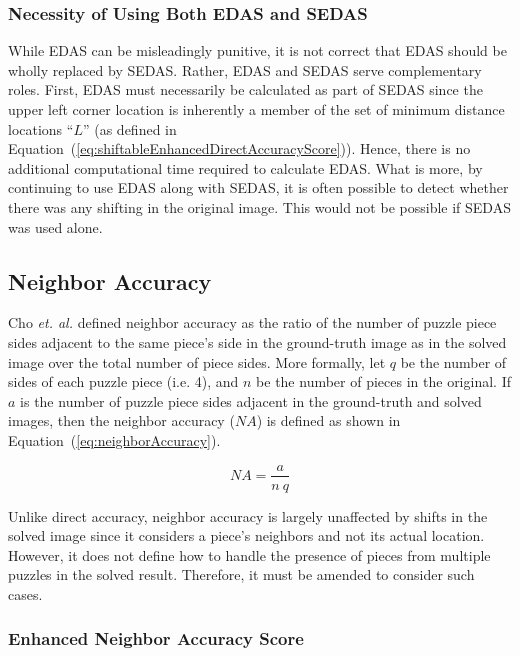 \documentclass{report}
\def\eref#1{(\ref{#1})}
\begin{document}
\subsubsection{Necessity of Using Both EDAS and SEDAS}\label{sec:importanceEdasSedas}

While EDAS can be misleadingly punitive, it is not correct that EDAS should be wholly replaced by SEDAS.  Rather, EDAS and SEDAS serve complementary roles.  First, EDAS must necessarily be calculated as part of SEDAS since the upper left corner location is inherently a member of the set of minimum distance locations ``$L$'' (as defined in Equation~\eref{eq:shiftableEnhancedDirectAccuracyScore}).  Hence, there is no additional computational time required to calculate EDAS.  What is more, by continuing to use EDAS along with SEDAS, it is often possible to detect whether there was any shifting in the original image.  This would not be possible if SEDAS was used alone.

\subsection{Neighbor Accuracy}\label{sec:neighborAccuracy}

Cho \textit{et. al.} \cite{cho2010} defined neighbor accuracy as the ratio of the number of puzzle piece sides adjacent to the same piece's side in the ground-truth image as in the solved image over the total number of piece sides.  More formally, let $q$ be the number of sides of each puzzle piece (i.e. 4), and $n$ be the number of pieces in the original.  If $a$ is the number of puzzle piece sides adjacent in the ground-truth and solved images, then the neighbor accuracy ($NA$) is defined as shown in Equation~\eref{eq:neighborAccuracy}.

\begin{equation} \label{eq:neighborAccuracy}
NA = \frac{a}{n~q}
\end{equation}

Unlike direct accuracy, neighbor accuracy is largely unaffected by shifts in the solved image since it considers a piece's neighbors and not its actual location.  However, it does not define how to handle the presence of pieces from multiple puzzles in the solved result.  Therefore, it must be amended to consider such cases.

\subsubsection{Enhanced Neighbor Accuracy Score}\label{sec:enhancedNeighborAccuracyScore}
\end{document}

